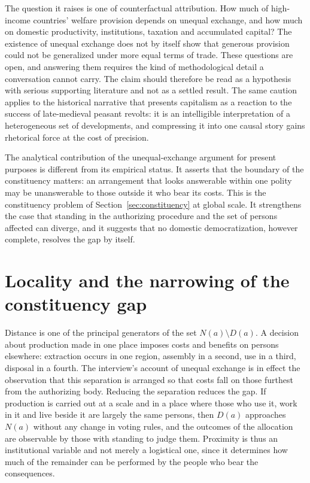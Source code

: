 \documentclass[12pt]{article}
\theoremstyle{definition}
\begin{document}
The question it raises is one of counterfactual attribution. How much of high-income countries' welfare provision depends on unequal exchange, and how much on domestic productivity, institutions, taxation and accumulated capital? The existence of unequal exchange does not by itself show that generous provision could not be generalized under more equal terms of trade. These questions are open, and answering them requires the kind of methodological detail a conversation cannot carry. The claim should therefore be read as a hypothesis with serious supporting literature and not as a settled result. The same caution applies to the historical narrative that presents capitalism as a reaction to the success of late-medieval peasant revolts: it is an intelligible interpretation of a heterogeneous set of developments, and compressing it into one causal story gains rhetorical force at the cost of precision.

The analytical contribution of the unequal-exchange argument for present purposes is different from its empirical status. It asserts that the boundary of the constituency matters: an arrangement that looks answerable within one polity may be unanswerable to those outside it who bear its costs. This is the constituency problem of Section~\ref{sec:constituency} at global scale. It strengthens the case that standing in the authorizing procedure and the set of persons affected can diverge, and it suggests that no domestic democratization, however complete, resolves the gap by itself.

\section{Locality and the narrowing of the constituency gap}\label{sec:locality}

Distance is one of the principal generators of the set $N(a)\setminus D(a)$. A decision about production made in one place imposes costs and benefits on persons elsewhere: extraction occurs in one region, assembly in a second, use in a third, disposal in a fourth. The interview's account of unequal exchange is in effect the observation that this separation is arranged so that costs fall on those furthest from the authorizing body. Reducing the separation reduces the gap. If production is carried out at a scale and in a place where those who use it, work in it and live beside it are largely the same persons, then $D(a)$ approaches $N(a)$ without any change in voting rules, and the outcomes of the allocation are observable by those with standing to judge them. Proximity is thus an institutional variable and not merely a logistical one, since it determines how much of the remainder can be performed by the people who bear the consequences.
\end{document}
